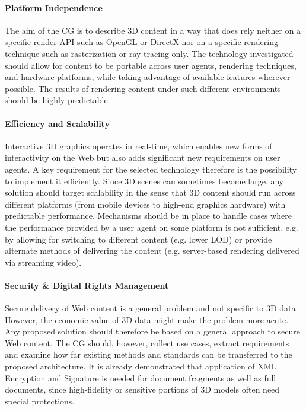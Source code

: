 \documentclass[review]{acmsiggraph}
\begin{document}
\paragraph{Platform Independence}
The aim of the CG is to describe 3D content in a way that does rely neither on a specific render API such as OpenGL or DirectX nor on a specific rendering technique such as rasterization or ray tracing only. The technology investigated should allow for content to be portable across user agents, rendering techniques, and hardware platforms, while taking advantage of available features wherever possible. The results of rendering content under such different environments should be highly predictable.

\paragraph{Efficiency and Scalability}
Interactive 3D graphics operates in real-time, which enables new forms of interactivity on the Web but also adds significant new requirements on user agents.  A key requirement for the selected technology therefore is the possibility to implement it efficiently. Since 3D scenes can sometimes become large, any solution should target scalability in the sense that 3D content should run across different platforms (from mobile devices to high-end graphics hardware) with predictable performance. Mechanisms should be in place to handle cases where the performance provided by a user agent on some platform is not sufficient, e.g. by allowing for switching to different content (e.g. lower LOD) or provide alternate methods of delivering the content (e.g. server-based rendering delivered via streaming video).

\paragraph{Security \& Digital Rights Management}
Secure delivery of Web content is a general problem and not specific to 3D data. However, the economic value of 3D data might make the problem more acute. Any proposed solution should therefore be based on a general approach to secure Web content. The CG should, however, collect use cases, extract requirements and examine how far existing methods and standards can be transferred to the proposed architecture. It is already demonstrated that application of XML Encryption and Signature is needed for document fragments as well as full documents, since high-fidelity or sensitive portions of 3D models often need special protections.
\end{document}
